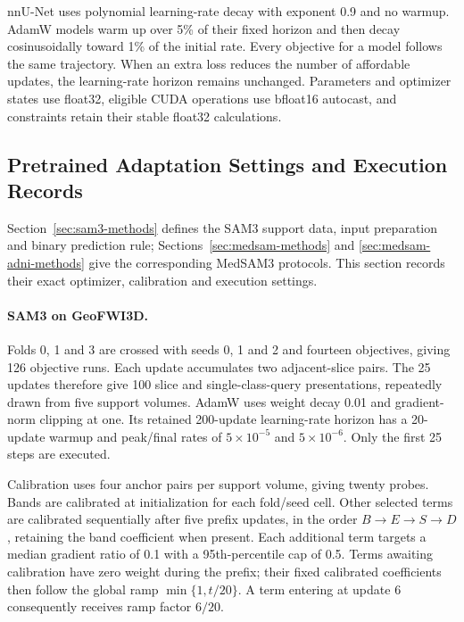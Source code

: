 \documentclass[12pt,a4paper]{article}
\begin{document}
nnU-Net uses polynomial learning-rate decay with exponent 0.9 and no
warmup. AdamW models warm up over 5\% of their fixed horizon and then
decay cosinusoidally toward 1\% of the initial rate. Every objective
for a model follows the same trajectory. When an extra loss reduces
the number of affordable updates, the learning-rate horizon remains
unchanged. Parameters and optimizer states use float32, eligible CUDA
operations use bfloat16 autocast, and constraints retain their stable
float32 calculations.

\subsection{Pretrained Adaptation Settings and Execution Records}
\label{sec:adaptation-implementation}

Section~\ref{sec:sam3-methods} defines the SAM3 support data, input
preparation and binary prediction rule; Sections~\ref{sec:medsam-methods}
and \ref{sec:medsam-adni-methods} give the corresponding MedSAM3
protocols. This section records their exact optimizer, calibration and
execution settings.

\paragraph{SAM3 on GeoFWI3D.}\label{sec:sam3-methods-details}
Folds 0, 1 and 3 are crossed with seeds 0, 1 and 2 and fourteen
objectives, giving 126 objective runs. Each update accumulates two
adjacent-slice pairs. The 25 updates therefore give 100 slice and
single-class-query presentations, repeatedly drawn from five support
volumes. AdamW uses weight decay 0.01 and gradient-norm clipping at
one. Its retained 200-update learning-rate horizon has a 20-update
warmup and peak/final rates of $5\times10^{-5}$ and $5\times10^{-6}$.
Only the first 25 steps are executed.

Calibration uses four anchor pairs per support volume, giving twenty
probes. Bands are calibrated at initialization for each fold/seed cell.
Other selected terms are calibrated sequentially after five prefix
updates, in the order $B\to E\to S\to D$, retaining the band
coefficient when present. Each additional term targets a median
gradient ratio of 0.1 with a 95th-percentile cap of 0.5. Terms awaiting
calibration have zero weight during the prefix; their fixed calibrated
coefficients then follow the global ramp $\min\{1,t/20\}$. A term
entering at update 6 consequently receives ramp factor $6/20$.
\end{document}
